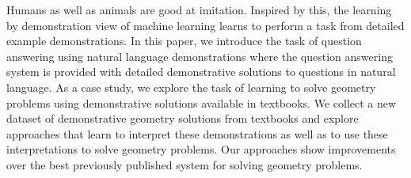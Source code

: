 Humans as well as animals are good at imitation. Inspired by this, the learning by demonstration view of machine learning learns to perform a task from detailed example demonstrations. In this paper, we introduce the task of question answering using natural language demonstrations where the question answering system is provided with detailed demonstrative solutions to questions in natural language. As a case study, we explore the task of learning to solve geometry problems using demonstrative solutions available in textbooks. We collect a new dataset of demonstrative geometry solutions from textbooks and explore approaches that learn to interpret these demonstrations as well as to use these interpretations to solve geometry problems. Our approaches show improvements over the best previously published system for solving geometry problems.
